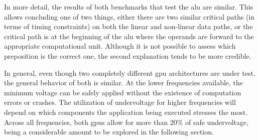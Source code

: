 In more detail, the results of both benchmarks that test the \acrshort{alu} are similar. This allows concluding one of two things, either  there are two similar critical paths (in terms of timing constraints) on both the linear and non-linear data paths, or the critical path is at the beginning of the  \acrshort{alu} where the operands are forward to the appropriate computational unit. Although it is not possible to assess which preposition is the correct one, the second explanation tends to be more credible.

In general, even though two completely different \acrshort{gpu} architectures are under test, the general behavior of both is similar. At the lower frequencies available, the minimum voltage can be safely applied without the existence of computation errors or crashes. The utilization of undervoltage for higher frequencies will depend on which components the application being executed stresses the most. Across all frequencies, both \acrshort{gpu}s allow for more than $20\%$ of safe undervoltage, being a considerable amount to be explored in the following section.




